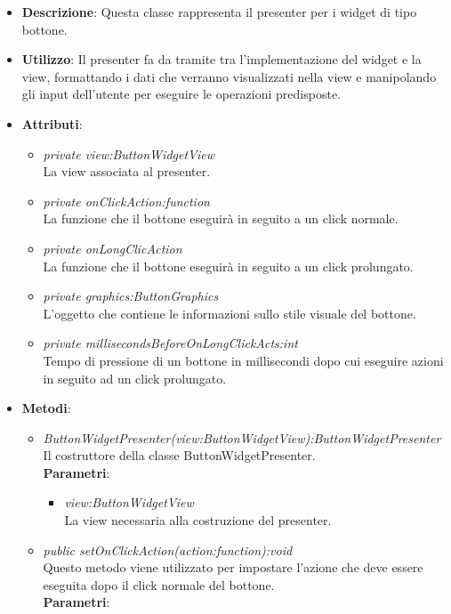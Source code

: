 \begin{itemize}
\item \textbf{Descrizione}: Questa classe rappresenta il presenter per i widget di tipo bottone.
\item \textbf{Utilizzo}: Il presenter fa da tramite tra l'implementazione del widget e la view, formattando i dati che verranno visualizzati nella view e manipolando gli input dell'utente per eseguire le operazioni predisposte.
\item \textbf{Attributi}:
	\begin{itemize}
	\item \textit{private view:ButtonWidgetView}\\
	La view associata al presenter.
	\item \textit{private onClickAction:function}\\
	La funzione che il bottone eseguirà in seguito a un click normale.
	\item \textit{private onLongClicAction}\\
	La funzione che il bottone eseguirà in seguito a un click prolungato.
	\item \textit{private graphics:ButtonGraphics}\\
	L'oggetto che contiene le informazioni sullo stile visuale del bottone.
	\item \textit{private millisecondsBeforeOnLongClickActs:int}\\
	Tempo di pressione di un bottone in millisecondi dopo cui eseguire azioni in seguito ad un click prolungato.
	\end{itemize}
\item \textbf{Metodi}:
	\begin{itemize}
	\item \textit{ButtonWidgetPresenter(view:ButtonWidgetView):ButtonWidgetPresenter}\\
	Il costruttore della classe ButtonWidgetPresenter.
		\\ \textbf{Parametri}: \begin{itemize}
		\item \textit{view:ButtonWidgetView}\\
		La view necessaria alla costruzione del presenter.
		\end{itemize}
	\item \textit{public setOnClickAction(action:function):void}\\
	Questo metodo viene utilizzato per impostare l'azione che deve essere eseguita dopo il click normale del bottone.
		\\ \textbf{Parametri}: \begin{itemize}

\end{itemize}
\end{itemize}
\end{itemize}
